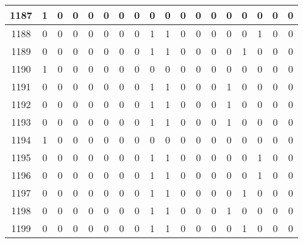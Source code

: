 \begin{tabular}{|c|c|c|c|c|c|c|c|c|c|c|c|c|c|c|c|c|c|}
\midrule
1187   &    1 &    0 &    0 &   0 &        0 &        0 &    0 &    0 &    0 &    0 &    0 &    0 &    0 &    0 &     0 &    0 &     0 \\
\midrule
1188   &    0 &    0 &    0 &   0 &        0 &        0 &    0 &    1 &    1 &    0 &    0 &    0 &    0 &    0 &     1 &    0 &     0 \\
\midrule
1189   &    0 &    0 &    0 &   0 &        0 &        0 &    0 &    1 &    1 &    0 &    0 &    0 &    0 &    1 &     0 &    0 &     0 \\
\midrule
1190   &    1 &    0 &    0 &   0 &        0 &        0 &    0 &    0 &    0 &    0 &    0 &    0 &    0 &    0 &     0 &    0 &     0 \\
\midrule
1191   &    0 &    0 &    0 &   0 &        0 &        0 &    0 &    1 &    1 &    0 &    0 &    0 &    1 &    0 &     0 &    0 &     0 \\
\midrule
1192   &    0 &    0 &    0 &   0 &        0 &        0 &    0 &    1 &    1 &    0 &    0 &    0 &    1 &    0 &     0 &    0 &     0 \\
\midrule
1193   &    0 &    0 &    0 &   0 &        0 &        0 &    0 &    1 &    1 &    0 &    0 &    0 &    1 &    0 &     0 &    0 &     0 \\
\midrule
1194   &    1 &    0 &    0 &   0 &        0 &        0 &    0 &    0 &    0 &    0 &    0 &    0 &    0 &    0 &     0 &    0 &     0 \\
\midrule
1195   &    0 &    0 &    0 &   0 &        0 &        0 &    0 &    1 &    1 &    0 &    0 &    0 &    0 &    0 &     1 &    0 &     0 \\
\midrule
1196   &    0 &    0 &    0 &   0 &        0 &        0 &    0 &    1 &    1 &    0 &    0 &    0 &    0 &    0 &     1 &    0 &     0 \\
\midrule
1197   &    0 &    0 &    0 &   0 &        0 &        0 &    0 &    1 &    1 &    0 &    0 &    0 &    0 &    1 &     0 &    0 &     0 \\
\midrule
1198   &    0 &    0 &    0 &   0 &        0 &        0 &    0 &    1 &    1 &    0 &    0 &    0 &    1 &    0 &     0 &    0 &     0 \\
\midrule
1199   &    0 &    0 &    0 &   0 &        0 &        0 &    0 &    1 &    1 &    0 &    0 &    0 &    0 &    1 &     0 &    0 &     0 \\\bottomrule\end{tabular}
